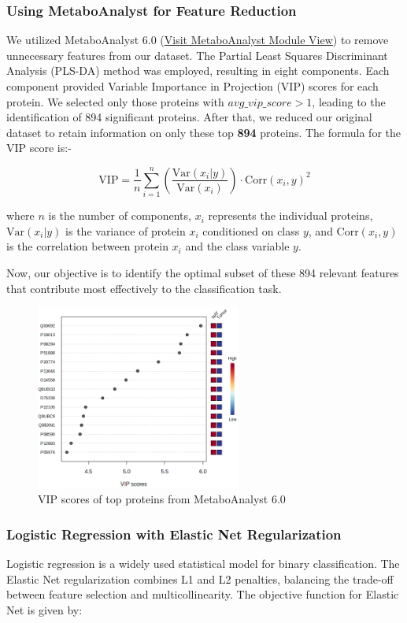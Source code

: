\documentclass[a4paper,12pt]{article}
\begin{document}
\subsubsection{Using MetaboAnalyst for Feature Reduction}
We utilized MetaboAnalyst 6.0 (\href{https://dev.metaboanalyst.ca/ModuleView.xhtml}{Visit MetaboAnalyst Module View})  to remove unnecessary features from our dataset. The Partial Least Squares Discriminant Analysis (PLS-DA) method was employed, resulting in eight components. Each component provided Variable Importance in Projection (VIP) scores for each protein. We selected only those proteins with \(avg\_vip\_score > 1\), leading to the identification of 894 significant proteins. After that, we reduced our original dataset to retain information on only these top \textbf{894} proteins. The formula for the VIP score is:-

\[
	\text{VIP} = \frac{1}{n}\sum_{i=1}^{n}\left(\frac{\text{Var}(x_i|y)}{\text{Var}(x_i)}\right) \cdot \text{Corr}(x_i,y)^2
\]

where \( n \) is the number of components, \( x_i \) represents the individual proteins, \( \text{Var}(x_i|y) \) is the variance of protein \( x_i \) conditioned on class \( y \), and \( \text{Corr}(x_i,y) \) is the correlation between protein \( x_i \) and the class variable \( y \).

Now, our objective is to identify the optimal subset of these 894 relevant features that contribute most effectively to the classification task.
\begin{figure}[h]
	\centering
	\includegraphics[width=0.6\textwidth]{images/pls_imp_0_dpi72.png}
	\caption{VIP scores of top proteins from MetaboAnalyst 6.0}
	\label{fig:example}
\end{figure}
\subsubsection{Logistic Regression with Elastic Net Regularization}
Logistic regression is a widely used statistical model for binary classification. The Elastic Net regularization combines L1 and L2 penalties, balancing the trade-off between feature selection and multicollinearity. The objective function for Elastic Net is given by:
\end{document}
